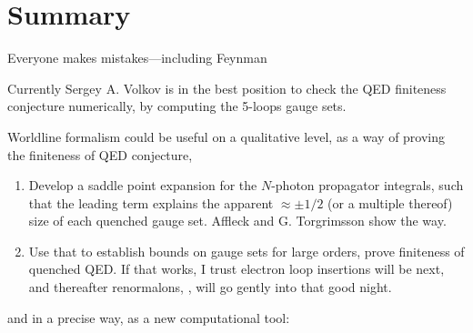 


\section{Summary}
\label{sect:Summary}

\begin{bartlett}{
{Everyone makes mistakes—including {Feynman}}
        }
\end{bartlett}
\bigskip

\noindent
Currently Sergey  A. Volkov is in the best position to check the QED
finiteness conjecture numerically, by computing the 5-loops gauge sets.

Worldline formalism could be useful on a qualitative level, as a way of
proving the finiteness of QED conjecture,
    \begin{enumerate}
  \item
Develop a saddle point expansion for the $N$-photon propagator
integrals, such that the
leading term explains the apparent $\approx \pm 1/2$ (or a multiple
thereof) size of each quenched gauge set. Affleck \etal{}
and G. Torgrimsson \etal{} show the way.
  \item
Use that to establish bounds on gauge sets for large orders, prove
finiteness of quenched QED. If that works, I trust electron loop
insertions will be next, and thereafter renormalons, \etc,
will go 
{gently into that good night}.
    \end{enumerate}
and in a precise way, as a new computational tool:
